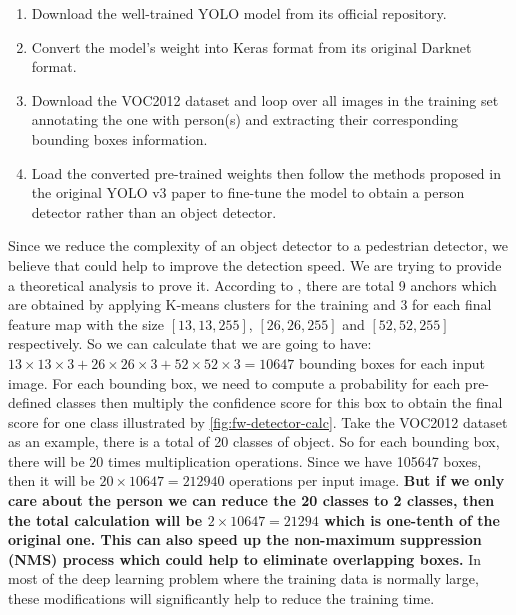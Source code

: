\begin{enumerate}
    \item Download the well-trained YOLO model from its official repository.
    \item Convert the model's weight into Keras format from its original
    Darknet format.
    \item Download the VOC2012 dataset and loop over all images in the training
    set annotating the one with person(s) and extracting their corresponding
    bounding boxes information.
    \item Load the converted pre-trained weights then follow the methods
    proposed in the original YOLO v3 paper \cite{yolov3-paper-2018} to fine-tune the model to obtain a person detector rather than an object
    detector.
\end{enumerate}

Since we reduce the complexity of an object detector to a pedestrian detector,
we believe that could help to improve the detection speed. We are trying to
provide a theoretical analysis to prove it.
According to \cite{yolov3-paper-2018}, there are total 9 anchors which are
obtained by applying K-means clusters for the
training and 3 for each final feature map with the size $[13, 13, 255]$,
$[26, 26, 255]$ and $[52, 52, 255]$ respectively. So we can calculate that we
are going to have:
$13 \times 13 \times 3 + 26 \times 26 \times 3 + 52 \times 52 \times 3=10647$
bounding boxes for each input image. For each bounding box, we need to compute
a probability for each pre-defined classes then multiply the confidence score for
this box to obtain the final score for one class illustrated by
\autoref{fig:fw-detector-calc}. Take the VOC2012 dataset as
an example, there is a total of 20 classes of object. So for each bounding box,
there will be 20 times multiplication operations. Since we have 105647 boxes,
then it will be $20 \times 10647 = 212940$ operations per input image.
\textbf{
    But if we only care about the person we can reduce the 20 classes to 2
    classes,
    then the total calculation will be $2 \times 10647 = 21294$ which is
    one-tenth
    of the original one. This can also speed up the non-maximum suppression
    (NMS)
    process which could help to eliminate overlapping boxes.
}
In most of the deep learning problem where the training data is normally large,
these modifications will significantly help to reduce the training time.

